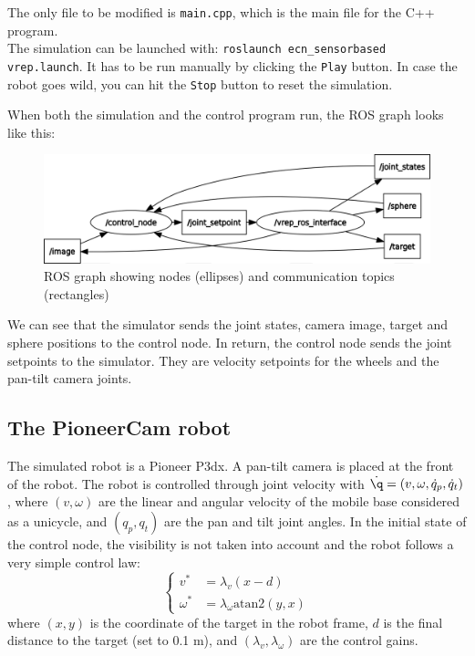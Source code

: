 \documentclass{ecnreport}
\begin{document}
The only file to be modified is \texttt{main.cpp}, which is the main file for the C++ program. \\
The simulation can be launched with: \texttt{roslaunch ecn\_sensorbased vrep.launch}. It has to be run manually by clicking the \texttt{Play} button. 
In case the robot goes wild, you can hit the \texttt{Stop} button to reset the simulation.

When both the simulation and the control program run, the ROS graph looks like this:

\begin{figure}[h!]\centering
 \includegraphics[width=.6\linewidth]{rosgraph}
 \caption{ROS graph showing nodes (ellipses) and communication topics (rectangles)}
 \label{fig:rosgraph}
\end{figure}

We can see that the simulator sends the joint states, camera image, target and sphere positions to the control node. In return, the control node sends the joint setpoints
to the simulator. They are velocity setpoints for the wheels and the pan-tilt camera joints.\\


\subsection{The PioneerCam robot}

The simulated robot is a Pioneer P3dx. A pan-tilt camera is placed at the front of the robot. The robot is controlled through joint velocity with $\dot \q = (v, \omega, \dot q_p, \dot q_t)$, where $(v,\omega)$ are the linear and angular velocity
of the mobile base considered as a unicycle, and $(q_p, q_t)$ are the pan and tilt joint angles. In the initial state of the control node, the visibility is not taken into account and the robot follows a very simple control law:
\begin{equation}\label{raw}
 \left\{\begin{array}{ll}
         v^* &= \lambda_v(x-d) \\ \omega^* &= \lambda_{\omega}\text{atan2}(y, x)
        \end{array}\right.
\end{equation}where $(x,y)$ is the coordinate of the target in the robot frame, $d$ is the final distance to the target (set to 0.1 m), and $(\lambda_v, \lambda_{\omega})$ are the control gains.\\
\end{document}
